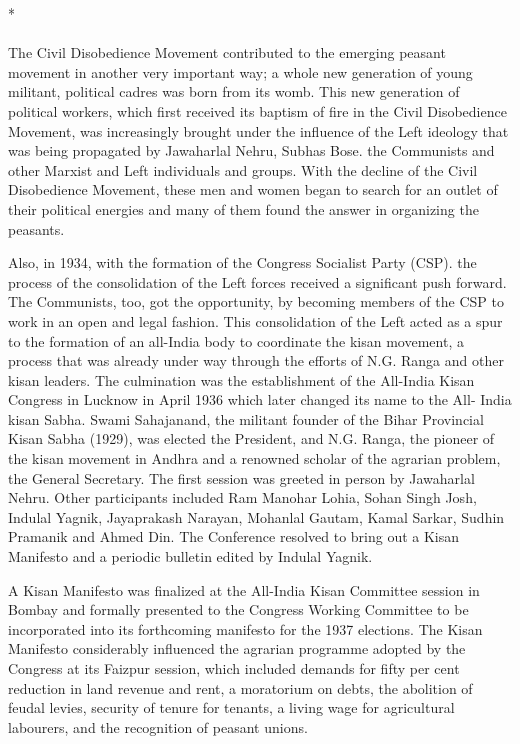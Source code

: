 \begin{center}*\end{center}

\paragraph*{}


The Civil Disobedience Movement contributed to the emerging peasant movement in another very important way; a whole new generation of young militant, political cadres was born from its womb. This new generation of political workers, which first received its baptism of fire in the Civil Disobedience Movement, was increasingly brought under the influence of the Left ideology that was being propagated by Jawaharlal Nehru, Subhas Bose. the Communists and other Marxist and Left individuals and groups. With the decline of the Civil Disobedience Movement, these men and women began to search for an outlet of their political energies and many of them found the answer in organizing the peasants.

Also, in 1934, with the formation of the Congress Socialist Party (CSP). the process of the consolidation of the Left forces received a significant push forward. The Communists, too, got the opportunity, by becoming members of the CSP to work in an open and legal fashion. This consolidation of the Left acted as a spur to the formation of an all-India body to coordinate the kisan movement, a process that was already under way through the efforts of N.G. Ranga and other kisan leaders. The culmination was the establishment of the All-India Kisan Congress in Lucknow in April 1936 which later changed its name to the All- India kisan Sabha. Swami Sahajanand, the militant founder of the Bihar Provincial Kisan Sabha (1929), was elected the President, and N.G. Ranga, the pioneer of the kisan movement in Andhra and a renowned scholar of the agrarian problem, the General Secretary. The first session was greeted in person by Jawaharlal Nehru. Other participants included Ram Manohar Lohia, Sohan Singh Josh, Indulal Yagnik, Jayaprakash Narayan, Mohanlal Gautam, Kamal Sarkar, Sudhin Pramanik and Ahmed Din. The Conference resolved to bring out a Kisan Manifesto and a periodic bulletin edited by Indulal Yagnik.

A Kisan Manifesto was finalized at the All-India Kisan Committee session in Bombay and formally presented to the Congress Working Committee to be incorporated into its forthcoming manifesto for the 1937 elections. The Kisan Manifesto considerably influenced the agrarian programme adopted by the Congress at its Faizpur session, which included demands for fifty per cent reduction in land revenue and rent, a moratorium on debts, the abolition of feudal levies, security of tenure for tenants, a living wage for agricultural labourers, and the recognition of peasant unions.


